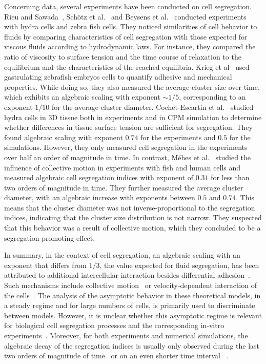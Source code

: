 \documentclass[10pt,letterpaper]{article}
\begin{document}
Concerning data, several experiments have been conducted on cell
segregation. Rieu and Sawada~\cite{RieSaw2002}, Schötz et al.~\cite{SchEtal2008}
and Beysens et al.~\cite{BeyForGla2000} conducted experiments with
hydra cells and zebra fish cells. They noticed similarities of cell
behavior to fluids
by comparing characteristics of cell segregation with those expected
for viscous fluids according to hydrodynamic laws. For instance, they
compared the ratio of viscosity to surface tension and the time course of
relaxation to the equilibrium and the characteristics of the reached
equilibria. Krieg et al~\cite{KriEtal2008} used gastrulating zebrafish embryos
cells to quantify adhesive and mechanical properties. While doing so, they
also measured the average cluster size over time, which exhibits an
algebraic scaling with exponent $\sim 1/5$, corresponding
to an exponent $1/10$ for the average cluster diameter.
Cochet-Escartin et al.~\cite{CocLocSteCol2017} studied hydra
cells in 3D tissue both in experiments and in CPM simulation to determine whether
differences in tissue surface tension are sufficient for segregation.
They found algebraic scaling with exponent $0.74$ for the experiments
and $0.5$ for the simulations. However, they only measured cell
segregation in the experiments over half an order of magnitude in
time. In contrast, Méhes et al.~\cite{MehMonNemVic2012} studied the influence
of collective motion in experiments with fish and human cells and
measured algebraic cell segregation indices with exponent of $0.31$ for
less than two orders of magnitude in time. They further measured the
average cluster diameter, with an algebraic increase with exponents between
$0.5$ and $0.74$. This means that the cluster diameter was not
inverse-proportional to the segregation indices, indicating that the
cluster size distribution is not narrow. They
suspected that this behavior was a result of collective motion, which
they concluded to be a segregation promoting effect.

In summary, in the context of cell segregation, an algebraic scaling
with an exponent that differs from $1/3$, the value expected for fluid
segregation, has been attributed to additional intercellular
interaction besides differential adhesion~\cite{MehVic2013,
  VisSpaDas2020}. Such mechanisms include collective
motion~\cite{MehMonNemVic2012, FujNakShiSaw2019, BeaAlmBru2017} or velocity-dependent
interaction of the cells~\cite{BelThoBruAlmCha2008,
  BeaBru2011,StrJuuBauKabDuk2014,Kab2012}. The analysis of the asymptotic
behavior in these theoretical models, in a steady regime and for large numbers
of cells, is primarily used to discriminate between models. However,
it is unclear whether this asymptotic regime is relevant for biological
cell segregation processes and the corresponding in-vitro
experiments~\cite{Dur2021}. Moreover, for both experiments and numerical
simulations, the algebraic decay of the segregation indices is usually
only observed during the last two orders of magnitude of
time~\cite{BeaBru2011,NakIsh2011,StrJuuBauKabDuk2014,Kab2012}
or on an even shorter time interval ~\cite{CocLocSteCol2017, MehMonNemVic2012}.
\end{document}
